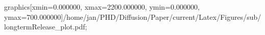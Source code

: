 graphics[xmin=0.000000, xmax=2200.000000, ymin=0.000000, ymax=700.000000]{/home/jan/PHD/Diffusion/Paper/current/Latex/Figures/sub/longtermRelease_plot.pdf}; 
